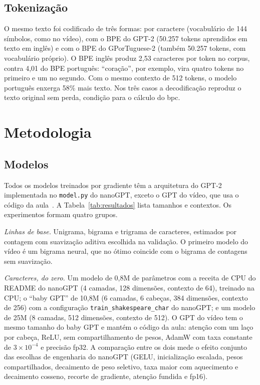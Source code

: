 \documentclass[conference]{IEEEtran}
\begin{document}
\subsection{Tokenização}

O mesmo texto foi codificado de três formas: por caractere (vocabulário de 144 símbolos, como no vídeo), com o BPE do GPT-2 (50.257 tokens aprendidos em texto em inglês) e com o BPE do GPorTuguese-2 (também 50.257 tokens, com vocabulário próprio). O BPE inglês produz 2,53 caracteres por token no corpus, contra 4,01 do BPE português: ``coração'', por exemplo, vira quatro tokens no primeiro e um no segundo. Com o mesmo contexto de 512 tokens, o modelo português enxerga 58\% mais texto. Nos três casos a decodificação reproduz o texto original sem perda, condição para o cálculo do bpc.

\section{Metodologia}

\subsection{Modelos}

Todos os modelos treinados por gradiente têm a arquitetura do GPT-2 implementada no \texttt{model.py} do nanoGPT, exceto o GPT do vídeo, que usa o código da aula~\cite{karpathy2023video}. A Tabela~\ref{tab:resultados} lista tamanhos e contextos. Os experimentos formam quatro grupos.

\emph{Linhas de base.} Unigrama, bigrama e trigrama de caracteres, estimados por contagem com suavização aditiva escolhida na validação. O primeiro modelo do vídeo é um bigrama neural, que no ótimo coincide com o bigrama de contagens sem suavização.

\emph{Caracteres, do zero.} Um modelo de 0,8M de parâmetros com a receita de CPU do README do nanoGPT (4 camadas, 128 dimensões, contexto de 64), treinado na CPU; o ``baby GPT'' de 10,8M (6 camadas, 6 cabeças, 384 dimensões, contexto de 256) com a configuração \texttt{train\_shakespeare\_char} do nanoGPT; e um modelo de 25M (8 camadas, 512 dimensões, contexto de 512). O GPT do vídeo tem o mesmo tamanho do baby GPT e mantém o código da aula: atenção com um laço por cabeça, ReLU, sem compartilhamento de pesos, AdamW com taxa constante de $3\times10^{-4}$ e precisão fp32. A comparação entre os dois mede o efeito conjunto das escolhas de engenharia do nanoGPT (GELU, inicialização escalada, pesos compartilhados, decaimento de peso seletivo, taxa maior com aquecimento e decaimento cosseno, recorte de gradiente, atenção fundida e fp16).
\end{document}
